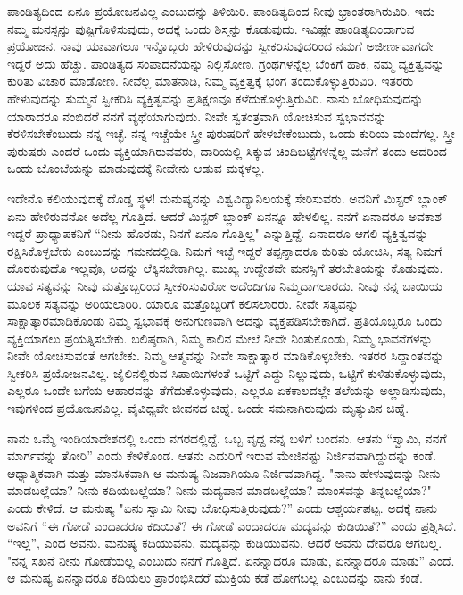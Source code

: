 ಪಾಂಡಿತ್ಯದಿಂದ ಏನೂ ಪ್ರಯೋಜನವಿಲ್ಲ ಎಂಬುದನ್ನು ತಿಳಿಯಿರಿ. ಪಾಂಡಿತ್ಯದಿಂದ ನೀವು ಭ್ರಾಂತರಾಗಿರುವಿರಿ. ಇದು ನಮ್ಮ ಮನಸ್ಸನ್ನು ಪುಷ್ಟಿಗೊಳಿಸುವುದು, ಅದಕ್ಕೆ ಒಂದು ಶಿಸ್ತನ್ನು ಕೊಡುವುದು. ಇವಿಷ್ಟೇ ಪಾಂಡಿತ್ಯದಿಂದಾಗುವ ಪ್ರಯೋಜನ. ನಾವು ಯಾವಾಗಲೂ ಇನ್ನೊಬ್ಬರು ಹೇಳಿರುವುದನ್ನು ಸ್ವೀಕರಿಸುವುದರಿಂದ ನಮಗೆ ಅಜೀರ್ಣವಾಗದೇ ಇದ್ದರೆ ಅದು ಹೆಚ್ಚು. ಪಾಂಡಿತ್ಯದ ಸಂಪಾದನೆಯನ್ನು ನಿಲ್ಲಿಸೋಣ. ಗ್ರಂಥಗಳನ್ನೆಲ್ಲ ಬೆಂಕಿಗೆ ಹಾಕಿ, ನಮ್ಮ ವ್ಯಕ್ತಿತ್ವವನ್ನು ಕುರಿತು ವಿಚಾರ ಮಾಡೋಣ. ನೀವೆಲ್ಲ ಮಾತನಾಡಿ, ನಿಮ್ಮ ವ್ಯಕ್ತಿತ್ವಕ್ಕೆ ಭಂಗ ತಂದುಕೊಳ್ಳುತ್ತಿರುವಿರಿ. ಇತರರು ಹೇಳುವುದನ್ನು ಸುಮ್ಮನೆ ಸ್ವೀಕರಿಸಿ ವ್ಯಕ್ತಿತ್ವವನ್ನು ಪ್ರತಿಕ್ಷಣವೂ ಕಳೆದುಕೊಳ್ಳುತ್ತಿರುವಿರಿ. ನಾನು ಬೋಧಿಸುವುದನ್ನು ಯಾರಾದರೂ ನಂಬಿದರೆ ನನಗೆ ವ್ಯಥೆಯಾಗುವುದು. ನೀವೇ ಸ್ವತಂತ್ರವಾಗಿ ಯೋಚಿಸುವ ಸ್ವಭಾವವನ್ನು ಕೆರಳಿಸಬೇಕೆಂಬುದು ನನ್ನ ಇಚ್ಛೆ. ನನ್ನ ಇಚ್ಚೆಯೇ ಸ್ತ್ರೀ ಪುರುಷರಿಗೆ ಹೇಳಬೇಕೆಂಬುದು, ಒಂದು ಕುರಿಯ ಮಂದೆಗಲ್ಲ. ಸ್ತ್ರೀ ಪುರುಷರು ಎಂದರೆ ಒಂದು ವ್ಯಕ್ತಿಯಾಗಿರುವವರು, ದಾರಿಯಲ್ಲಿ ಸಿಕ್ಕುವ ಚಿಂದಿಬಟ್ಟೆಗಳನ್ನೆಲ್ಲ ಮನೆಗೆ ತಂದು ಅದರಿಂದ ಒಂದು ಬೊಂಬೆಯನ್ನು ಮಾಡುವುದಕ್ಕೆ ನೀವೇನು ಆಡುವ ಮಕ್ಕಳಲ್ಲ.

ಇದೇನೊ ಕಲಿಯುವುದಕ್ಕೆ ದೊಡ್ಡ ಸ್ಥಳ! ಮನುಷ್ಯನನ್ನು ವಿಶ್ವವಿದ್ಯಾನಿಲಯಕ್ಕೆ ಸೇರಿಸುವರು. ಅವನಿಗೆ ಮಿಸ್ಟರ್ ಬ್ಲಾಂಕ್ ಏನು ಹೇಳಿರುವನೋ ಅದೆಲ್ಲ ಗೊತ್ತಿದೆ. ಆದರೆ ಮಿಸ್ಟರ್ ಬ್ಲಾಂಕ್ ಏನನ್ನೂ ಹೇಳಲಿಲ್ಲ. ನನಗೆ ಏನಾದರೂ ಅವಕಾಶ ಇದ್ದರೆ ಪ್ರಾಧ್ಯಾಪಕನಿಗೆ “ನೀನು ಹೊರಡು, ನಿನಗೆ ಏನೂ ಗೊತ್ತಿಲ್ಲ" ಎನ್ನುತ್ತಿದ್ದೆ. ಏನಾದರೂ ಆಗಲಿ ವ್ಯಕ್ತಿತ್ವವನ್ನು ರಕ್ಷಿಸಿಕೊಳ್ಳಬೇಕು ಎಂಬುದನ್ನು ಗಮನದಲ್ಲಿಡಿ. ನಿಮಗೆ ಇಚ್ಛೆ ಇದ್ದರೆ ತಪ್ಪನ್ನಾದರೂ ಕುರಿತು ಯೋಚಿಸಿ, ಸತ್ಯ ನಿಮಗೆ ದೊರಕುವುದೊ ಇಲ್ಲವೊ, ಅದನ್ನು ಲೆಕ್ಕಿಸಬೇಕಾಗಿಲ್ಲ. ಮುಖ್ಯ ಉದ್ದೇಶವೇ ಮನಸ್ಸಿಗೆ ತರಬೇತಿಯನ್ನು ಕೊಡುವುದು. ಯಾವ ಸತ್ಯವನ್ನು ನೀವು ಮತ್ತೊಬ್ಬರಿಂದ ಸ್ವೀಕರಿಸುವಿರೋ ಅದೆಂದಿಗೂ ನಿಮ್ಮದಾಗಲಾರದು. ನೀವು ನನ್ನ ಬಾಯಿಯ ಮೂಲಕ ಸತ್ಯವನ್ನು ಅರಿಯಲಾರಿರಿ. ಯಾರೂ ಮತ್ತೊಬ್ಬರಿಗೆ ಕಲಿಸಲಾರರು. ನೀವೇ ಸತ್ಯವನ್ನು ಸಾಕ್ಷಾತ್ಕಾರಮಾಡಿಕೊಂಡು ನಿಮ್ಮ ಸ್ವಭಾವಕ್ಕೆ ಅನುಗುಣವಾಗಿ ಅದನ್ನು ವ್ಯಕ್ತಪಡಿಸಬೇಕಾಗಿದೆ. ಪ್ರತಿಯೊಬ್ಬರೂ ಒಂದು ವ್ಯಕ್ತಿಯಾಗಲು ಪ್ರಯತ್ನಿಸಬೇಕು. ಬಲಿಷ್ಠರಾಗಿ, ನಿಮ್ಮ ಕಾಲಿನ ಮೇಲೆ ನೀವೇ ನಿಂತುಕೊಂಡು, ನಿಮ್ಮ ಭಾವನೆಗಳನ್ನು ನೀವೇ ಯೋಚಿಸುವಂತೆ ಆಗಬೇಕು. ನಿಮ್ಮ ಆತ್ಮವನ್ನು ನೀವೇ ಸಾಕ್ಷಾತ್ಕಾರ ಮಾಡಿಕೊಳ್ಳಬೇಕು. ಇತರರ ಸಿದ್ದಾಂತವನ್ನು ಸ್ವೀಕರಿಸಿ ಪ್ರಯೋಜನವಿಲ್ಲ. ಜೈಲಿನಲ್ಲಿರುವ ಸಿಪಾಯಿಗಳಂತೆ ಒಟ್ಟಿಗೆ ಎದ್ದು ನಿಲ್ಲುವುದು, ಒಟ್ಟಿಗೆ ಕುಳಿತುಕೊಳ್ಳುವುದು, ಎಲ್ಲರೂ ಒಂದೇ ಬಗೆಯ ಆಹಾರವನ್ನು ತೆಗೆದುಕೊಳ್ಳುವುದು, ಎಲ್ಲರೂ ಏಕಕಾಲದಲ್ಲೇ ತಲೆಯನ್ನು ಅಲ್ಲಾಡಿಸುವುದು, ಇವುಗಳಿಂದ ಪ್ರಯೋಜನವಿಲ್ಲ. ವೈವಿಧ್ಯವೇ ಜೀವನದ ಚಿಹ್ನೆ. ಒಂದೇ ಸಮನಾಗಿರುವುದು ಮೃತ್ಯುವಿನ ಚಿಹ್ನೆ.

ನಾನು ಒಮ್ಮೆ ಇಂಡಿಯಾದೇಶದಲ್ಲಿ ಒಂದು ನಗರದಲ್ಲಿದ್ದೆ. ಒಬ್ಬ ವೃದ್ದ ನನ್ನ ಬಳಿಗೆ ಬಂದನು. ಆತನು “ಸ್ವಾಮಿ, ನನಗೆ ಮಾರ್ಗವನ್ನು ತೋರಿ” ಎಂದು ಕೇಳಿಕೊಂಡ. ಆತನು ಎದುರಿಗೆ ಇರುವ ಮೇಜಿನಷ್ಟು ನಿರ್ಜಿವವಾಗಿದ್ದುದನ್ನು ಕಂಡೆ. ಆಧ್ಯಾತ್ಮಿಕವಾಗಿ ಮತ್ತು ಮಾನಸಿಕವಾಗಿ ಆ ಮನುಷ್ಯ ನಿಜವಾಗಿಯೂ ನಿರ್ಜಿವವಾಗಿದ್ದ. "ನಾನು ಹೇಳುವುದನ್ನು ನೀನು ಮಾಡಬಲ್ಲೆಯಾ? ನೀನು ಕದಿಯಬಲ್ಲೆಯಾ? ನೀನು ಮದ್ಯಪಾನ ಮಾಡಬಲ್ಲೆಯಾ? ಮಾಂಸವನ್ನು ತಿನ್ನಬಲ್ಲೆಯಾ?" ಎಂದು ಕೇಳಿದೆ. ಆ ಮನುಷ್ಯ "ಏನು ಸ್ವಾಮಿ ನೀವು ಬೋಧಿಸುತ್ತಿರುವುದು?” ಎಂದು ಆಶ್ಚರ್ಯಪಟ್ಟ. ಅದಕ್ಕೆ ನಾನು ಅವನಿಗೆ “ಈ ಗೋಡೆ ಎಂದಾದರೂ ಕದಿಯಿತೆ? ಈ ಗೋಡೆ ಎಂದಾದರೂ ಮದ್ಯವನ್ನು ಕುಡಿಯಿತೆ?'' ಎಂದು ಪ್ರಶ್ನಿಸಿದೆ. “ಇಲ್ಲ”, ಎಂದ ಅವನು. ಮನುಷ್ಯ ಕದಿಯುವನು, ಮದ್ಯವನ್ನು ಕುಡಿಯುವನು, ಆದರೆ ಅವನು ದೇವರೂ ಆಗಬಲ್ಲ. "ನನ್ನ ಸಖನೆ ನೀನು ಗೋಡೆಯಲ್ಲ ಎಂಬುದು ನನಗೆ ಗೊತ್ತಿದೆ. ಏನನ್ನಾದರೂ ಮಾಡು, ಏನನ್ನಾದರೂ ಮಾಡು'' ಎಂದೆ. ಆ ಮನುಷ್ಯ ಏನನ್ನಾದರೂ ಕದಿಯಲು ಪ್ರಾರಂಭಿಸಿದರೆ ಮುಕ್ತಿಯ ಕಡೆ ಹೋಗಬಲ್ಲ ಎಂಬುದನ್ನು ನಾನು ಕಂಡೆ.

